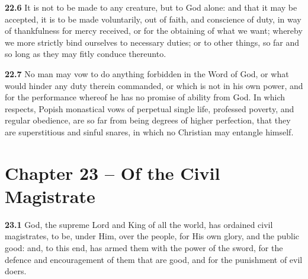 \par\textbf{22.6} It is not to be made to any creature, but to God alone: and that it may be accepted, it is to be made voluntarily, out of faith, and conscience of duty, in way of thankfulness for mercy received, or for the obtaining of what we want; whereby we more strictly bind ourselves to necessary duties; or to other things, so far and so long as they may fitly conduce thereunto.   

\par\textbf{22.7} No man may vow to do anything forbidden in the Word of God, or what would hinder any duty therein commanded, or which is not in his own power, and for the performance whereof he has no promise of ability from God. In which respects, Popish monastical vows of perpetual single life, professed poverty, and regular obedience, are so far from being degrees of higher perfection, that they are superstitious and sinful snares, in which no Christian may entangle himself.  

\section{Chapter 23 -- Of the Civil Magistrate}

\par\textbf{23.1} God, the supreme Lord and King of all the world, has ordained civil magistrates, to be, under Him, over the people, for His own glory, and the public good: and, to this end, has armed them with the power of the sword, for the defence and encouragement of them that are good, and for the punishment of evil doers.   

